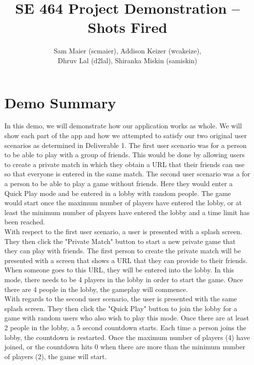 \documentclass[11pt, oneside]{article}   	%
\title{SE 464 Project Demonstration -- Shots Fired}
\author{Sam Maier (scmaier), Addison Keizer (wcakeize), \\Dhruv Lal (d2lal), Shiranka Miskin (samiskin)}
\begin{document}
\maketitle


\clearpage

\section{Demo Summary}
\hspace*{5mm}
In this demo, we will demonstrate how our application works as whole. We will show
each part of the app and how we attempted to satisfy our two original user scenarios as
determined in Deliverable 1. The first user scenario was for a person to be able
to play with a group of friends. This would be done by allowing users to create
a private match in which they obtain a URL that their friends can use so that
everyone is entered in the same match. The second user scenario was a for a person
to be able to play a game without friends. Here they would enter a Quick Play mode
and be entered in a lobby with random people. The game would start once the maximum
number of players have entered the lobby, or at least the minimum number of players
have entered the lobby and a time limit has been reached.\\

With respect to the first user scenario, a user is presented with a splash screen.
They then click the "Private Match" button to start a new private game that they
can play with friends. The first person to create the private match will be presented
with a screen that shows a URL that they can provide to their friends. When someone
goes to this URL, they will be entered into the lobby. In this mode,
there needs to be 4 players in the lobby in order to start the game. Once there are 4
people in the lobby, the gameplay will commence.\\

With regards to the second user scenario, the user is presented with the same splash
screen. They then click the "Quick Play" button to join the lobby for a game with
random users who also wish to play this mode. Once there are at least 2 people in the
lobby, a 5 second countdown starts. Each time a person joins the lobby, the countdown
is restarted. Once the maximum number of players (4) have joined, or the countdown hits
0 when there are more than the minimum number of players (2), the game will start.\\
\end{document}
